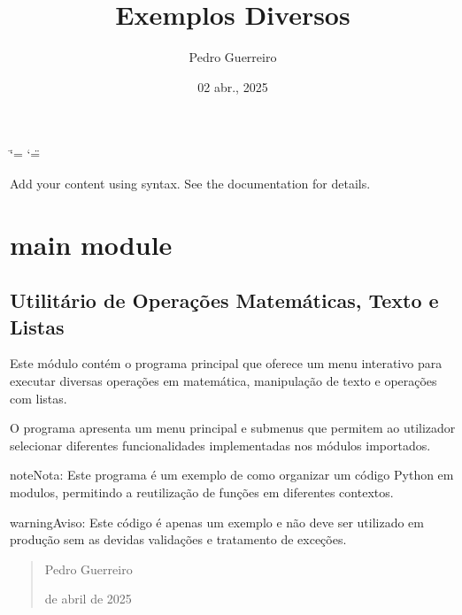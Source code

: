 \documentclass[letterpaper,10pt,portuges]{sphinxmanual}
\title{Exemplos Diversos}
\date{02 abr., 2025}
\author{Pedro Guerreiro}
\begin{document}
\ifdefined\shorthandoff
  \ifnum\catcode`\=\string=\active\shorthandoff{=}\fi
  \ifnum\catcode`\"=\active{}\fi
\fi

\pagestyle{empty}
\sphinxmaketitle
\pagestyle{plain}
\sphinxtableofcontents
\pagestyle{normal}
\label{\detokenize{index::doc}}


\sphinxAtStartPar
Add your content using  syntax. See the
documentation for details.

\sphinxstepscope


\chapter{main module}
\label{\detokenize{main:module-main}}\label{\detokenize{main:main-module}}\label{\detokenize{main::doc}}

\section{Utilitário de Operações Matemáticas, Texto e Listas}
\label{\detokenize{main:utilitario-de-operacoes-matematicas-texto-e-listas}}
\sphinxAtStartPar
Este módulo contém o programa principal que oferece um menu interativo
para executar diversas operações em matemática, manipulação de texto e
operações com listas.

\sphinxAtStartPar
O programa apresenta um menu principal e submenus que permitem ao
utilizador selecionar diferentes funcionalidades implementadas nos
módulos importados.

\begin{sphinxadmonition}{note}{Nota:}
\sphinxAtStartPar
Este programa é um exemplo de como organizar um código Python
em modulos, permitindo a reutilização de funções em diferentes
contextos.
\end{sphinxadmonition}

\begin{sphinxadmonition}{warning}{Aviso:}
\sphinxAtStartPar
Este código é apenas um exemplo e não deve ser utilizado em
produção sem as devidas validações e tratamento de exceções.
\end{sphinxadmonition}
\begin{quote}\begin{description}
\sphinxAtStartPar
Pedro Guerreiro

 de abril de 2025


\end{description}\end{quote}
\end{document}
